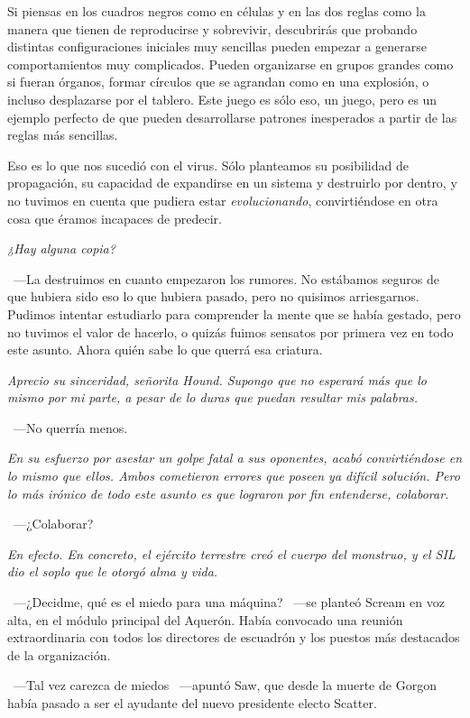 \rquoti Si piensas en los cuadros negros como en células y en las dos reglas como la manera que tienen de reproducirse y sobrevivir, descubrirás que probando distintas configuraciones iniciales muy sencillas pueden empezar a generarse comportamientos muy complicados. Pueden organizarse en grupos grandes como si fueran órganos, formar círculos que se agrandan como en una explosión, o incluso desplazarse por el tablero. Este juego es sólo eso, un juego, pero es un ejemplo perfecto de que pueden desarrollarse patrones inesperados a partir de las reglas más sencillas.

\rquoti Eso es lo que nos sucedió con el virus. Sólo planteamos su posibilidad de propagación, su capacidad de expandirse en un sistema y destruirlo por dentro, y no tuvimos en cuenta que pudiera estar \emph{evolucionando}, convirtiéndose en otra cosa que éramos incapaces de predecir.

\emph{¿Hay alguna copia?}

~---La destruimos en cuanto empezaron los rumores. No estábamos seguros de que hubiera sido eso lo que hubiera pasado, pero no quisimos arriesgarnos. Pudimos intentar estudiarlo para comprender la mente que se había gestado, pero no tuvimos el valor de hacerlo, o quizás fuimos sensatos por primera vez en todo este asunto. Ahora quién sabe lo que querrá esa criatura.

\emph{Aprecio su sinceridad, señorita Hound. Supongo que no esperará más que lo mismo por mi parte, a pesar de lo duras que puedan resultar mis palabras.}

~---No querría menos.

\emph{En su esfuerzo por asestar un golpe fatal a sus oponentes, acabó convirtiéndose en lo mismo que ellos. Ambos cometieron errores que poseen ya difícil solución. Pero lo más irónico de todo este asunto es que lograron por fin entenderse, colaborar.}

~---¿Colaborar?

\emph{En efecto. En concreto, el ejército terrestre creó el cuerpo del monstruo, y el SIL dio el soplo que le otorgó alma y vida.}

\bigskip\noindent
~---¿Decidme, qué es el miedo para una máquina? ~---se planteó Scream en voz alta, en el módulo principal del Aquerón. Había convocado una reunión extraordinaria con todos los directores de escuadrón y los puestos más destacados de la organización.

~---Tal vez carezca de miedos ~---apuntó Saw, que desde la muerte de Gorgon había pasado a ser el ayudante del nuevo presidente electo Scatter.

